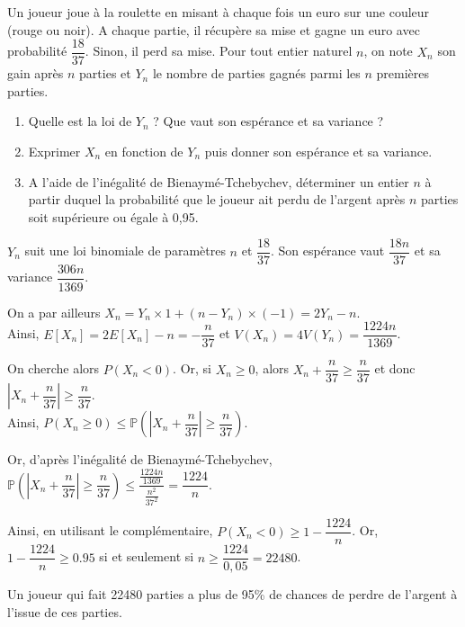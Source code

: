 \documentclass[11pt,fleqn, openany]{book} %
\begin{document}
\begin{exercise}Un joueur joue à la roulette en misant à chaque fois un euro sur une couleur (rouge ou noir). A chaque partie, il récupère sa mise et gagne un euro avec probabilité $\dfrac{18}{37}$. Sinon, il perd sa mise. Pour tout entier naturel $n$, on note $X_n$ son gain après $n$ parties et $Y_n$ le nombre de parties gagnés parmi les $n$ premières parties.
\begin{enumerate}
\item Quelle est la loi de $Y_n$ ? Que vaut son espérance et sa variance ?
\item Exprimer $X_n$ en fonction de $Y_n$ puis donner son espérance et sa variance.
\item A l'aide de l'inégalité de Bienaymé-Tchebychev, déterminer un entier $n$ à partir duquel la probabilité que le joueur ait perdu de l'argent après $n$ parties soit supérieure ou égale à 0,95.
\end{enumerate}\end{exercise}

\begin{solution}$Y_n$ suit une loi binomiale de paramètres $n$ et $\dfrac{18}{37}$. Son espérance vaut $\dfrac{18n}{37}$ et sa variance $\dfrac{306n}{1369}$.

On a par ailleurs $X_n=Y_n \times 1 + (n-Y_n) \times (-1)=2Y_n-n$.\\ Ainsi, $E[X_n]=2E[X_n]-n=-\dfrac{n}{37}$ et $V(X_n)=4V(Y_n)=\dfrac{1224n}{1369}$.

On cherche alors $P(X_n <0)$. Or, si $X_n \geqslant 0$, alors $X_n+\dfrac{n}{37} \geqslant  \dfrac{n}{37}$ et donc $\left| X_n + \dfrac{n}{37} \right| \geqslant \dfrac{n}{37}$. \\Ainsi, $P(X_n \geqslant 0) \leqslant \mathbb{P}\left(\left| X_n + \dfrac{n}{37} \right| \geqslant \dfrac{n}{37}\right)$.

Or, d'après l'inégalité de Bienaymé-Tchebychev, $\mathbb{P}\left(\left| X_n + \dfrac{n}{37} \right| \geqslant \dfrac{n}{37}\right)  \leqslant \dfrac{\frac{1224n}{1369}}{\frac{n^2}{37^2}}=\dfrac{1224}{n}$. 

Ainsi, en utilisant le complémentaire, $P(X_n <0) \geqslant 1-\dfrac{1224}{n}$. Or, $1-\dfrac{1224}{n} \geqslant 0.95$ si et seulement si $n \geqslant \dfrac{1224}{0,05}=22480$. 

Un joueur qui fait 22480 parties a plus de 95\% de chances de perdre de l'argent à l'issue de ces parties.\end{solution}
\end{document}
